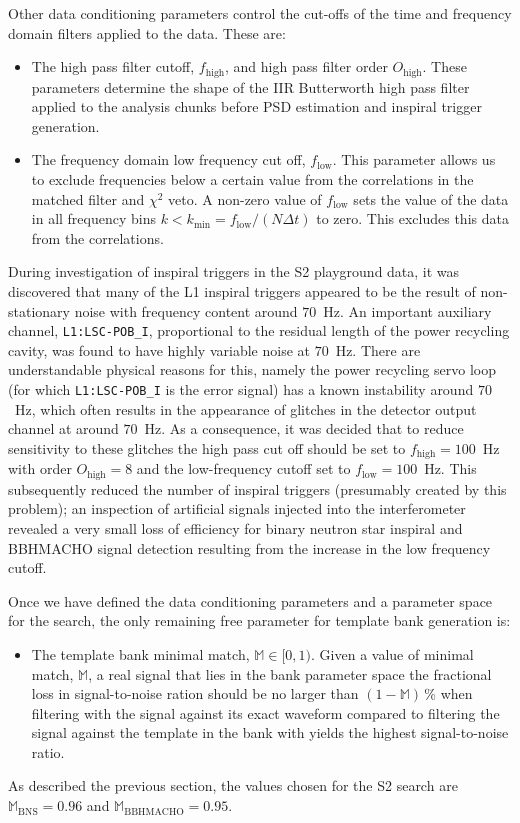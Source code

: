 Other data conditioning parameters control the cut-offs of the time
and frequency domain filters applied to the data. These are:
\begin{itemize}
\item The high pass filter cutoff, $f_\mathrm{high}$, and high pass filter
order $O_\mathrm{high}$. These parameters determine the shape of the IIR
Butterworth high pass filter applied to the analysis chunks before PSD
estimation and inspiral trigger generation.

\item The frequency domain low frequency cut off, $f_\mathrm{low}$. This
parameter allows us to exclude frequencies below a certain value from the
correlations in the matched filter and $\chi^2$ veto. A non-zero value of
$f_\mathrm{low}$ sets the value of the data in all frequency bins $k <
k_\mathrm{min} = f_\mathrm{low} / (N \Delta t)$ to zero. This excludes this
data from the correlations.
\end{itemize}
During investigation of inspiral triggers in the S2 playground data, it was
discovered that many of the L1 inspiral triggers appeared to be the result of
non-stationary noise with frequency content around $70$~Hz.  An important
auxiliary channel, \texttt{L1:LSC-POB\_I}, proportional to the residual length
of the power recycling cavity, was found to have highly variable noise at
$70$~Hz.  There are understandable physical reasons for this, namely the power
recycling servo loop (for which \texttt{L1:LSC-POB\_I} is the error signal)
has a known instability around $70$~Hz, which often results in the appearance
of glitches in the detector output channel at around $70$~Hz.  As a
consequence, it was decided that to reduce sensitivity to these glitches the
high pass cut off should be set to $f_\mathrm{high} = 100$~Hz with order
$O_\mathrm{high} = 8$ and the low-frequency cutoff set to $f_\mathrm{low} =
100$~Hz.  This subsequently reduced the number of inspiral triggers
(presumably created by this problem); an inspection of artificial signals
injected into the interferometer revealed a very small loss of efficiency for
binary neutron star inspiral and BBHMACHO signal detection resulting from the
increase in the low frequency cutoff.

Once we have defined the data conditioning parameters and a parameter space
for the search, the only remaining free parameter for template bank generation
is:
\begin{itemize}
\item The template bank minimal match, $\mathbb{M} \in [0,1)$. Given a value
of minimal match, $\mathbb{M}$, a real signal that lies in the bank parameter
space the fractional loss in signal-to-noise ration should be no larger than
$(1 - \mathbb{M})\, \%$ when filtering with the signal against its exact
waveform compared to filtering the signal against the template in the bank
with yields the highest signal-to-noise ratio.
\end{itemize}
As described the previous section, the values chosen for the S2 search are
$\mathbb{M}_\mathrm{BNS} = 0.96$ and $\mathbb{M}_\mathrm{BBHMACHO} = 0.95$. 

